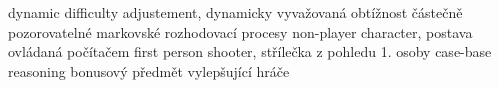 \abbrv[DDA]  dynamic difficulty adjustement, dynamicky vyvažovaná obtížnost
\abbrv[POMDP]     částečně pozorovatelné markovské rozhodovací procesy
\abbrv[NPC]			non-player character, postava ovládaná počítačem
\abbrv[FPS]     first person shooter, střílečka z pohledu 1. osoby
\abbrv[CBR]    case-base reasoning
\abbrv[power-up] bonusový předmět vylepšující hráče
\stopAbbreviations

\endinput
